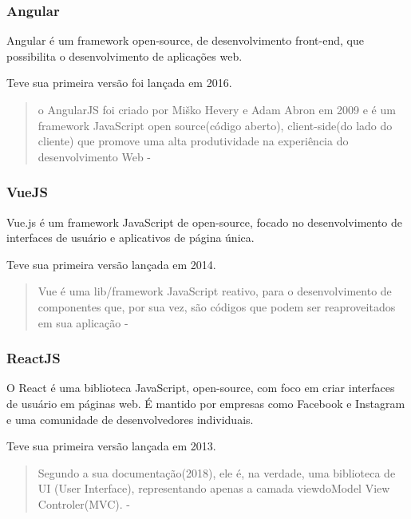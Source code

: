 \subsubsection{Angular}

Angular é um framework open-source, de desenvolvimento front-end, que possibilita o desenvolvimento de aplicações web.

Teve sua primeira versão foi lançada em 2016.

\begin{quote}
  o AngularJS foi criado por Miško Hevery e Adam Abron  em  2009  e  é  um  framework  JavaScript open  source(código  aberto), client-side(do lado  do  cliente)  que  promove  uma  alta  produtividade  na  experiência  do  desenvolvimento Web - \cite{ferreira2018analise}
\end{quote}


\subsubsection{VueJS}

Vue.js é um framework JavaScript de open-source, focado no desenvolvimento de interfaces de usuário e aplicativos de página única.

Teve sua primeira versão lançada em 2014.

\begin{quote}
  Vue é uma lib/framework JavaScript reativo, para  o  desenvolvimento  de  componentes  que,  por  sua  vez,  são  códigos  que  podem  ser reaproveitados em sua aplicação - \cite{ferreira2018analise}
\end{quote}


\subsubsection{ReactJS}

O React é uma biblioteca JavaScript, open-source, com foco em criar interfaces de usuário em páginas web. É mantido por empresas como Facebook e Instagram e uma comunidade de desenvolvedores individuais. 

Teve sua primeira versão lançada em 2013.

\begin{quote}
  Segundo a sua documentação(2018), ele é, na  verdade,  uma  biblioteca  de  UI  (User  Interface),  representando  apenas  a  camada viewdoModel  View  Controler(MVC).  - \cite{ferreira2018analise}
\end{quote}

